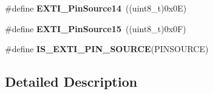 \begin{DoxyCompactItemize}
\item 
\hypertarget{group___s_y_s_c_f_g___e_x_t_i___pin___sources_gadf2623bff33cc8e7697fdb2641998b22}{\#define {\bfseries E\-X\-T\-I\-\_\-\-Pin\-Source14}~((uint8\-\_\-t)0x0\-E)}\label{group___s_y_s_c_f_g___e_x_t_i___pin___sources_gadf2623bff33cc8e7697fdb2641998b22}

\item 
\hypertarget{group___s_y_s_c_f_g___e_x_t_i___pin___sources_gace55270207b97b533ac87ab0a7047857}{\#define {\bfseries E\-X\-T\-I\-\_\-\-Pin\-Source15}~((uint8\-\_\-t)0x0\-F)}\label{group___s_y_s_c_f_g___e_x_t_i___pin___sources_gace55270207b97b533ac87ab0a7047857}

\item 
\#define {\bfseries I\-S\-\_\-\-E\-X\-T\-I\-\_\-\-P\-I\-N\-\_\-\-S\-O\-U\-R\-C\-E}(P\-I\-N\-S\-O\-U\-R\-C\-E)
\end{DoxyCompactItemize}


\subsection{Detailed Description}


